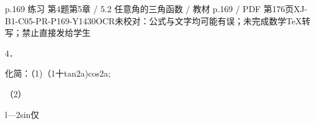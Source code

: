 \begin{bankitem}{p.169 练习 第4题}{第5章 / 5.2 任意角的三角函数 / 教材 p.169 / PDF 第176页}{XJ-B1-C05-PR-P169-Y1430}{OCR未校对：公式与文字均可能有误；未完成数学TeX转写；禁止直接发给学生}
\begin{ocrdraft}
\par
4．
\par
化简：（1)（1十tan2a)cos2a;
\par
（2）
\par
l—2sin仅
\end{ocrdraft}
\end{bankitem}
